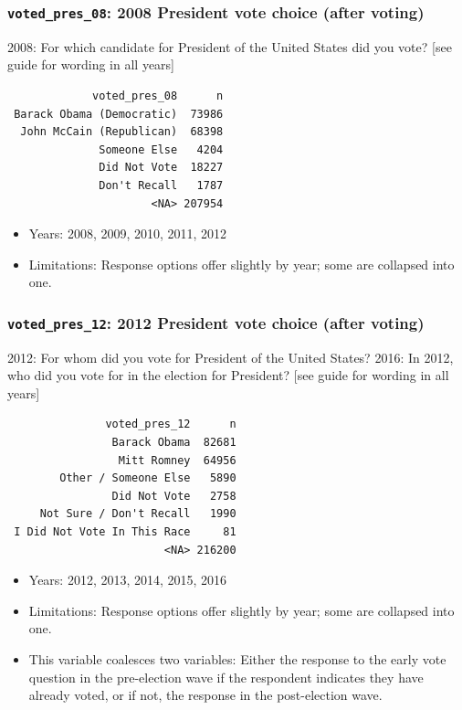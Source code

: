 \documentclass[10pt,article,oneside]{memoir}
\theoremstyle{definition}
\begin{document}
\subsubsection{\texorpdfstring{\texttt{voted\_pres\_08}: 2008 President
vote choice (after
voting)}{voted\_pres\_08: 2008 President vote choice (after voting)}}\label{voted_pres_08-2008-president-vote-choice-after-voting}

2008: For which candidate for President of the United States did you
vote? {[}see guide for wording in all years{]}

\begin{verbatim}
             voted_pres_08      n
 Barack Obama (Democratic)  73986
  John McCain (Republican)  68398
              Someone Else   4204
              Did Not Vote  18227
              Don't Recall   1787
                      <NA> 207954
\end{verbatim}

\begin{itemize}
\tightlist
\item
  Years: 2008, 2009, 2010, 2011, 2012
\item
  Limitations: Response options offer slightly by year; some are
  collapsed into one.
\end{itemize}

\subsubsection{\texorpdfstring{\texttt{voted\_pres\_12}: 2012 President
vote choice (after
voting)}{voted\_pres\_12: 2012 President vote choice (after voting)}}\label{voted_pres_12-2012-president-vote-choice-after-voting}

2012: For whom did you vote for President of the United States? 2016: In
2012, who did you vote for in the election for President? {[}see guide
for wording in all years{]}

\begin{verbatim}
               voted_pres_12      n
                Barack Obama  82681
                 Mitt Romney  64956
        Other / Someone Else   5890
                Did Not Vote   2758
     Not Sure / Don't Recall   1990
 I Did Not Vote In This Race     81
                        <NA> 216200
\end{verbatim}

\begin{itemize}
\tightlist
\item
  Years: 2012, 2013, 2014, 2015, 2016
\item
  Limitations: Response options offer slightly by year; some are
  collapsed into one.
\item
  This variable coalesces two variables: Either the response to the
  early vote question in the pre-election wave if the respondent
  indicates they have already voted, or if not, the response in the
  post-election wave.
\end{itemize}
\end{document}
